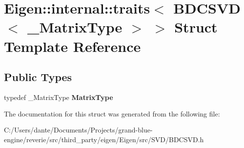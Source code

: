 \hypertarget{struct_eigen_1_1internal_1_1traits_3_01_b_d_c_s_v_d_3_01___matrix_type_01_4_01_4}{}\section{Eigen\+::internal\+::traits$<$ B\+D\+C\+S\+VD$<$ \+\_\+\+Matrix\+Type $>$ $>$ Struct Template Reference}
\label{struct_eigen_1_1internal_1_1traits_3_01_b_d_c_s_v_d_3_01___matrix_type_01_4_01_4}
\subsection*{Public Types}
\begin{DoxyCompactItemize}
\item 
\mbox{\label{struct_eigen_1_1internal_1_1traits_3_01_b_d_c_s_v_d_3_01___matrix_type_01_4_01_4_afd85342058bafd2b0fd201db71b54f50}} 
typedef \+\_\+\+Matrix\+Type {\bfseries Matrix\+Type}
\end{DoxyCompactItemize}


The documentation for this struct was generated from the following file\+:\begin{DoxyCompactItemize}
\item 
C\+:/\+Users/dante/\+Documents/\+Projects/grand-\/blue-\/engine/reverie/src/third\+\_\+party/eigen/\+Eigen/src/\+S\+V\+D/B\+D\+C\+S\+V\+D.\+h\end{DoxyCompactItemize}
